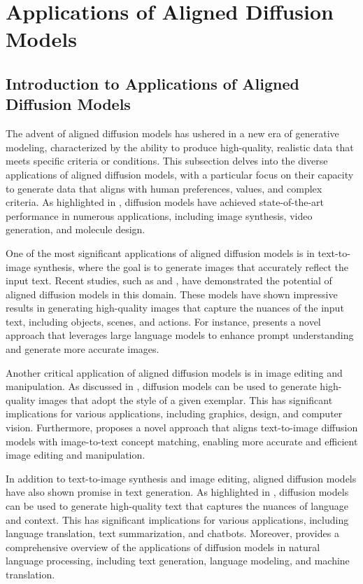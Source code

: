 \documentclass[11pt,a4paper]{article}
\begin{document}
\section{Applications of Aligned Diffusion Models}



\subsection{Introduction to Applications of Aligned Diffusion Models}


The advent of aligned diffusion models has ushered in a new era of generative modeling, characterized by the ability to produce high-quality, realistic data that meets specific criteria or conditions. This subsection delves into the diverse applications of aligned diffusion models, with a particular focus on their capacity to generate data that aligns with human preferences, values, and complex criteria. As highlighted in \cite{doi:10.1145/3626235}, diffusion models have achieved state-of-the-art performance in numerous applications, including image synthesis, video generation, and molecule design.

One of the most significant applications of aligned diffusion models is in text-to-image synthesis, where the goal is to generate images that accurately reflect the input text. Recent studies, such as \cite{doi:10.1109/cvpr52729.2023.00977} and \cite{doi:10.1109/iccv51070.2023.00713}, have demonstrated the potential of aligned diffusion models in this domain. These models have shown impressive results in generating high-quality images that capture the nuances of the input text, including objects, scenes, and actions. For instance, \cite{arxiv:2305.13655} presents a novel approach that leverages large language models to enhance prompt understanding and generate more accurate images.

Another critical application of aligned diffusion models is in image editing and manipulation. As discussed in \cite{doi:10.1007/s41095-023-0371-3}, diffusion models can be used to generate high-quality images that adopt the style of a given exemplar. This has significant implications for various applications, including graphics, design, and computer vision. Furthermore, \cite{arxiv:2404.03653} proposes a novel approach that aligns text-to-image diffusion models with image-to-text concept matching, enabling more accurate and efficient image editing and manipulation.

In addition to text-to-image synthesis and image editing, aligned diffusion models have also shown promise in text generation. As highlighted in \cite{arxiv:2212.10325}, diffusion models can be used to generate high-quality text that captures the nuances of language and context. This has significant implications for various applications, including language translation, text summarization, and chatbots. Moreover, \cite{arxiv:2303.07576} provides a comprehensive overview of the applications of diffusion models in natural language processing, including text generation, language modeling, and machine translation.
\end{document}
